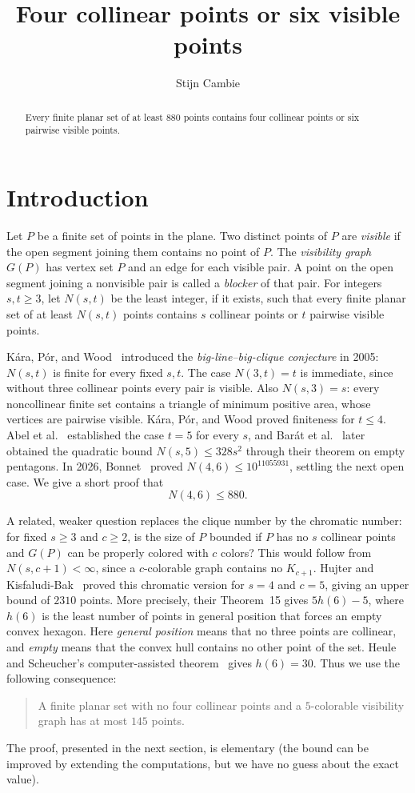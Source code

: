 \documentclass[11pt,a4paper]{amsart}
\title{Four collinear points or six visible points}
\author{Stijn Cambie}
\date{}
\begin{document}
\pagestyle{plain}
\begin{abstract}
Every finite planar set of at least $880$ points contains four collinear
points or six pairwise visible points. 
\end{abstract}
\maketitle
\section{Introduction}

Let $P$ be a finite set of points in the plane. Two distinct points of $P$
are \emph{visible} if the open segment joining them contains no point of
$P$. The \emph{visibility graph} $G(P)$ has vertex set $P$ and an edge
for each visible pair. A point on the open segment joining a nonvisible
pair is called a \emph{blocker} of that pair.
For integers $s,t\ge3$, let $N(s,t)$ be the least integer, if it exists,
such that every finite planar set of at least $N(s,t)$ points contains
$s$ collinear points or $t$ pairwise visible points.

K\'ara, P\'or, and Wood~\cite{KPW} introduced the
\emph{big-line--big-clique conjecture} in 2005: $N(s,t)$ is finite for
every fixed $s,t$. The case $N(3,t)=t$ is immediate, since without three
collinear points every pair is visible. Also $N(s,3)=s$: every
noncollinear finite set contains a triangle of minimum positive area,
whose vertices are pairwise visible.
K\'ara, P\'or, and Wood proved finiteness for $t\le4$.
Abel et al.~\cite{ABBCetal} established the case $t=5$ for every $s$,
and Bar\'at et al.~\cite{Barat} later obtained the quadratic bound
$N(s,5)\le328s^2$ through their theorem on empty pentagons.
In 2026, Bonnet~\cite{Bonnet} proved $N(4,6)\le10^{11055931}$,
settling the next open case. We give a short proof that
\[
                         N(4,6)\le880.
\]

A related, weaker question replaces the clique number by the chromatic
number: for fixed $s\ge3$ and $c\ge2$, is the size of $P$ bounded if $P$ has no
$s$ collinear points and $G(P)$ can be properly colored with $c$ colors?
This would follow from $N(s,c+1)<\infty$, since a $c$-colorable graph
contains no $K_{c+1}$. Hujter and Kisfaludi-Bak~\cite{HKB} proved this
chromatic version for $s=4$ and $c=5$, giving an upper bound of $2310$
points. More precisely, their Theorem~15 gives $5h(6)-5$, where $h(6)$
is the least number of points in general position that forces an empty
convex hexagon. Here \emph{general position} means that no three points
are collinear, and \emph{empty} means that the convex hull contains no
other point of the set.
Heule and Scheucher's computer-assisted theorem~\cite{HS} gives
$h(6)=30$. Thus we use the following consequence:
\begin{quote}
A finite planar set with no four collinear points and a $5$-colorable
visibility graph has at most $145$ points.
\end{quote}
The proof, presented in the next section, is elementary (the bound can be improved by extending the computations, but we have no guess about the exact value).
\end{document}
